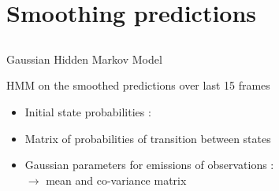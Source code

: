 \section{Smoothing predictions} \subsection{}\label{}

\begin{frame}{Gaussian Hidden Markov Model}
	
	\begin{block}{HMM on the smoothed predictions over last 15 frames}
		\vspace{-.2cm}
	\begin{itemize}
		\item Initial state probabilities :
		\item Matrix of probabilities of transition between states 
		\item Gaussian parameters for emissions of observations : \\
		\hspace{4cm} $\rightarrow$ mean and co-variance matrix
	\end{itemize}
	\end{block}	
	

\end{frame}
